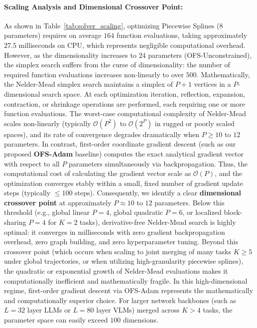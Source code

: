 \paragraph{Scaling Analysis and Dimensional Crossover Point:}
As shown in Table~\ref{tab:solver_scaling}, optimizing Piecewise Splines ($8$ parameters) requires on average $164$ function evaluations, taking approximately $27.5$ milliseconds on CPU, which represents negligible computational overhead.
However, as the dimensionality increases to $24$ parameters (OFS-Unconstrained), the simplex search suffers from the curse of dimensionality: the number of required function evaluations increases non-linearly to over $500$.
Mathematically, the Nelder-Mead simplex search maintains a simplex of $P+1$ vertices in a $P$-dimensional search space.
At each optimization iteration, reflection, expansion, contraction, or shrinkage operations are performed, each requiring one or more function evaluations.
The worst-case computational complexity of Nelder-Mead scales non-linearly (typically $\mathcal{O}(P^2)$ to $\mathcal{O}(2^P)$ in rugged or poorly scaled spaces), and its rate of convergence degrades dramatically when $P \ge 10$ to $12$ parameters.
In contrast, first-order coordinate gradient descent (such as our proposed \textbf{OFS-Adam} baseline) computes the exact analytical gradient vector with respect to all $P$ parameters simultaneously via backpropagation.
Thus, the computational cost of calculating the gradient vector scale as $\mathcal{O}(P)$, and the optimization converges stably within a small, fixed number of gradient update steps (typically $\le 100$ steps).
Consequently, we identify a clear \textbf{dimensional crossover point} at approximately $P \approx 10$ to $12$ parameters.
Below this threshold (e.g., global linear $P=4$, global quadratic $P=6$, or localized block-sharing $P=4$ for $K=2$ tasks), derivative-free Nelder-Mead search is highly optimal: it converges in milliseconds with zero gradient backpropagation overhead, zero graph building, and zero hyperparameter tuning.
Beyond this crossover point (which occurs when scaling to joint merging of many tasks $K \ge 5$ under global trajectories, or when utilizing high-granularity piecewise splines), the quadratic or exponential growth of Nelder-Mead evaluations makes it computationally inefficient and mathematically fragile.
In this high-dimensional regime, first-order gradient descent via OFS-Adam represents the mathematically and computationally superior choice.
For larger network backbones (such as $L=32$ layer LLMs or $L=80$ layer VLMs) merged across $K > 4$ tasks, the parameter space can easily exceed $100$ dimensions.
